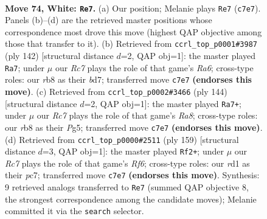 \documentclass[11pt]{article}
\begin{document}
\clearpage

\begin{figure}[p]\centering
\begin{subfigure}{0.46\textwidth}\centering
\resizebox{\linewidth}{!}{%
\newchessgame
\chessboard[
  setfen={1r6/2R5/7k/8/5K2/8/7P/3r4 w - - 15 74},
  showmover=false,
  pgfstyle=straightmove, color=movearrow, markmove={c7-e7}
]}
\caption{}
\end{subfigure}\hfill
\begin{subfigure}{0.46\textwidth}\centering
\resizebox{\linewidth}{!}{%
\newchessgame
\chessboard[
  setfen={8/3b4/R7/4k2P/8/8/5K2/2r5 w - - 2 72},
  showmover=false,
  pgfstyle=straightmove, color=movearrow, markmove={a6-a7}
]}
\caption{}
\end{subfigure}
\\[4pt]
\begin{subfigure}{0.46\textwidth}\centering
\resizebox{\linewidth}{!}{%
\newchessgame
\chessboard[
  setfen={R7/4k3/8/6Pp/8/1r6/8/4K3 w - - 13 73},
  showmover=false,
  pgfstyle=straightmove, color=movearrow, markmove={a8-a7}
]}
\caption{}
\end{subfigure}\hfill
\begin{subfigure}{0.46\textwidth}\centering
\resizebox{\linewidth}{!}{%
\newchessgame
\chessboard[
  setfen={8/k1P5/6R1/p7/8/5r2/1K6/8 b - - 0 80},
  showmover=false,
  pgfstyle=straightmove, color=movearrow, markmove={f3-f2}
]}
\caption{}
\end{subfigure}
\caption{\textbf{Move 74, White: \texttt{Re7}.} (a) Our position; Melanie plays \texttt{Re7} (\texttt{c7e7}). Panels (b)--(d) are the retrieved master positions whose correspondence most drove this move (highest QAP objective among those that transfer to it). (b) Retrieved from \texttt{ccrl\_top\_p0001\#3987} (ply 142) [structural distance $d$=2, QAP obj=1]: the master played \texttt{Ra7}; under $\mu$ our \emph{Rc7} plays the role of that game's \emph{Ra6}; cross-type roles: our \emph{r}b8 as their \emph{b}d7; transferred move \texttt{c7e7} \textbf{(endorses this move)}. (c) Retrieved from \texttt{ccrl\_top\_p0002\#3466} (ply 144) [structural distance $d$=2, QAP obj=1]: the master played \texttt{Ra7+}; under $\mu$ our \emph{Rc7} plays the role of that game's \emph{Ra8}; cross-type roles: our \emph{r}b8 as their \emph{P}g5; transferred move \texttt{c7e7} \textbf{(endorses this move)}. (d) Retrieved from \texttt{ccrl\_top\_p0000\#2511} (ply 159) [structural distance $d$=3, QAP obj=1]: the master played \texttt{Rf2+}; under $\mu$ our \emph{Rc7} plays the role of that game's \emph{Rf6}; cross-type roles: our \emph{r}d1 as their \emph{p}c7; transferred move \texttt{c7e7} \textbf{(endorses this move)}. Synthesis: 9 retrieved analogs transferred to \texttt{Re7} (summed QAP objective 8, the strongest correspondence among the candidate moves); Melanie committed it via the \texttt{search} selector.}
\label{fig:thought-m146}
\end{figure}
\end{document}
